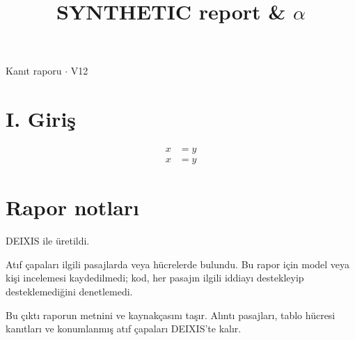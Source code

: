 \documentclass[journal]{IEEEtran}
\begin{document}
\renewcommand{\abstractname}{Özet}
\renewcommand{\IEEEkeywordsname}{Dizin Terimleri}
\renewcommand{\refname}{Kaynaklar}

\title{SYNTHETIC report \& \ensuremath{\alpha}}

\maketitle

\noindent Kanıt raporu \ensuremath{\cdot} V12

\section*{I. Giriş}

\begin{align}x&=y\end{align}
\cite{Synth26}
\begin{align}x&=y\end{align}
\cite{Synth26}

\section*{Rapor notları}

DEIXIS ile üretildi.

Atıf çapaları ilgili pasajlarda veya hücrelerde bulundu. Bu rapor için model veya kişi incelemesi kaydedilmedi; kod, her pasajın ilgili iddiayı destekleyip desteklemediğini denetlemedi.

Bu çıktı raporun metnini ve kaynakçasını taşır. Alıntı pasajları, tablo hücresi kanıtları ve konumlanmış atıf çapaları DEIXIS'te kalır.




\end{document}
